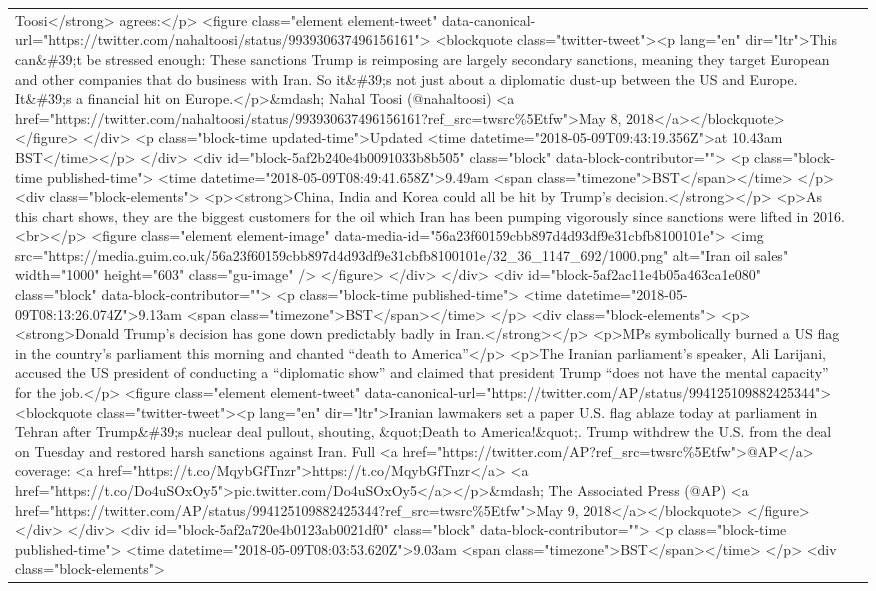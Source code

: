\documentclass[]{article}
\begin{document}
\begin{table}[!h]
{\begin{tabular}[t]{ll}
Toosi</strong> agrees:</p>  <figure class="element element-tweet" data-canonical-url="https://twitter.com/nahaltoosi/status/993930637496156161">  <blockquote class="twitter-tweet"><p lang="en" dir="ltr">This can\&\#39;t be stressed enough: These sanctions Trump is reimposing are largely secondary sanctions, meaning they target European and other companies that do business with Iran. So it\&\#39;s not just about a diplomatic dust-up between the US and Europe. It\&\#39;s a financial hit on Europe.</p>\&mdash; Nahal Toosi (@nahaltoosi) <a href="https://twitter.com/nahaltoosi/status/993930637496156161?ref\_src=twsrc\%5Etfw">May 8, 2018</a></blockquote>  </figure> </div>   <p class="block-time updated-time">Updated <time datetime="2018-05-09T09:43:19.356Z">at 10.43am BST</time></p>  </div> <div id="block-5af2b240e4b0091033b8b505" class="block" data-block-contributor=""> <p class="block-time published-time"> <time datetime="2018-05-09T08:49:41.658Z">9.49am <span class="timezone">BST</span></time> </p>    <div class="block-elements">  <p><strong>China, India and Korea could all be hit by Trump’s decision.</strong></p> <p>As this chart shows, they are the biggest customers for the oil which Iran has been pumping vigorously since sanctions were lifted in 2016.<br></p>  <figure class="element element-image" data-media-id="56a23f60159cbb897d4d93df9e31cbfb8100101e"> <img src="https://media.guim.co.uk/56a23f60159cbb897d4d93df9e31cbfb8100101e/32\_36\_1147\_692/1000.png" alt="Iran oil sales" width="1000" height="603" class="gu-image" /> </figure> </div>   </div> <div id="block-5af2ac11e4b05a463ca1e080" class="block" data-block-contributor=""> <p class="block-time published-time"> <time datetime="2018-05-09T08:13:26.074Z">9.13am <span class="timezone">BST</span></time> </p>    <div class="block-elements">  <p><strong>Donald Trump’s decision has gone down predictably badly in Iran.</strong></p> <p>MPs symbolically burned a US flag in the country’s parliament this morning and chanted “death to America”</p> <p>The Iranian parliament’s speaker, Ali Larijani, accused the US president of conducting a “diplomatic show” and claimed that president Trump “does not have the mental capacity” for the job.</p>  <figure class="element element-tweet" data-canonical-url="https://twitter.com/AP/status/994125109882425344">  <blockquote class="twitter-tweet"><p lang="en" dir="ltr">Iranian lawmakers set a paper U.S. flag ablaze today at parliament in Tehran after Trump\&\#39;s nuclear deal pullout, shouting, \&quot;Death to America!\&quot;. Trump withdrew the U.S. from the deal on Tuesday and restored harsh sanctions against Iran. Full <a href="https://twitter.com/AP?ref\_src=twsrc\%5Etfw">@AP</a> coverage: <a href="https://t.co/MqybGfTnzr">https://t.co/MqybGfTnzr</a> <a href="https://t.co/Do4uSOxOy5">pic.twitter.com/Do4uSOxOy5</a></p>\&mdash; The Associated Press (@AP) <a href="https://twitter.com/AP/status/994125109882425344?ref\_src=twsrc\%5Etfw">May 9, 2018</a></blockquote>  </figure> </div>   </div> <div id="block-5af2a720e4b0123ab0021df0" class="block" data-block-contributor=""> <p class="block-time published-time"> <time datetime="2018-05-09T08:03:53.620Z">9.03am <span class="timezone">BST</span></time> </p>    <div class="block-elements">  
\end{tabular}}
\end{table}
\end{document}
